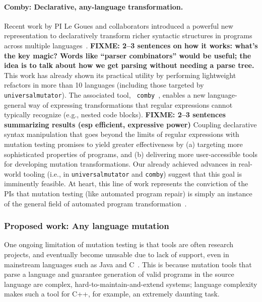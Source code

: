 \paragraph{Comby: Declarative, any-language transformation.} Recent work by PI
Le Goues and collaborators introduced a powerful new representation to
declaratively 
transform richer syntactic structures in programs across multiple
languages~\cite{rvt-ppc}. \textbf{FIXME: 2--3 sentences on how it works: what's
  the key magic?  Words like ``parser combinators'' would be useful; the idea is
to talk about how we get parsing without needing a parse tree.}  This work has
already shown its practical utility by
performing lightweight refactors in more than 10 languages (including those
targeted by {\tt universalmutator}). The associated tool, {\tt
comby}~\cite{comby-github}, enables a new language-general way of expressing
transformations that regular expressions cannot typically recognize (e.g.,
nested code blocks). \textbf{FIXME: 2--3 sentences summarizing results (esp efficient,
  expressive power)} 
Coupling declarative syntax manipulation that goes beyond the limits
of regular expressions with
mutation testing promises to yield greater effectiveness by (a) targeting more
sophisticated properties of programs, and (b) delivering more user-accessible
tools for developing mutation transformations. Our already achieved advances in 
real-world tooling (i.e., in {\tt universalmutator} and {\tt comby}) suggest that
this goal is imminently feasible.  At heart, this line of work
represents the conviction of the PIs that mutation testing (like
automated program repair) is simply
an instance of the general field of automated program transformation~\cite{Ptransform}.

\subsubsection{Proposed work: Any language mutation}
One ongoing limitation of mutation testing is that tools are often research
projects, and eventually become unusable due to lack of support, even in
mainstream languages such as Java and C~\cite{MutChoice}.
This is because mutation tools that parse a language and guarantee generation of
valid programs in the source language are complex, hard-to-maintain-and-extend
systems; language complexity makes such a tool for C++, for example, an
extremely daunting task.   

